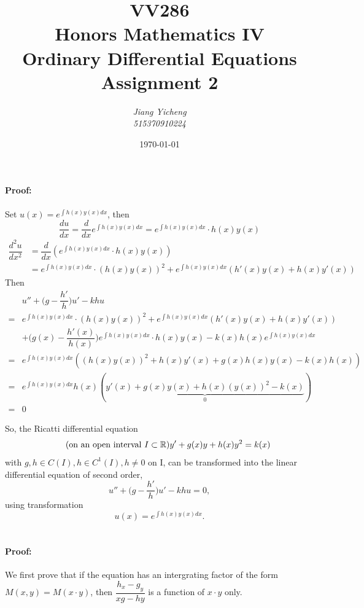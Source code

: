 \documentclass[a4paper,12pt,titlepage]{article}
\author{\textit{Jiang Yicheng}\\\textit{515370910224}}
\title{\textbf{VV286\\ Honors Mathematics IV\\
Ordinary Differential Equations\\
		Assignment 2}}
\date{\today}
\begin{document}
\maketitle

\section{}
\paragraph{Proof:}
Set $u(x)=e^{\int h(x)y(x)dx}$, then
\begin{equation*}
\dfrac{du}{dx}=\dfrac{d}{dx}e^{\int h(x)y(x)dx}=e^{\int h(x)y(x)dx}\cdot h(x)y(x)
\end{equation*}
\begin{align*}
\dfrac{d^2u}{dx^2}&=\dfrac{d}{dx}(e^{\int h(x)y(x)dx}\cdot h(x)y(x))\\
&=e^{\int h(x)y(x)dx}\cdot (h(x)y(x))^2+e^{\int h(x)y(x)dx}(h'(x)y(x)+h(x)y'(x))
\end{align*}
Then
\begin{align*}
&u''+\Big(g-\dfrac{h'}{h}\Big)u'-khu\\
=&e^{\int h(x)y(x)dx}\cdot (h(x)y(x))^2+e^{\int h(x)y(x)dx}(h'(x)y(x)+h(x)y'(x))\\
&+\Big(g(x)-\dfrac{h'(x)}{h(x)}\Big)e^{\int h(x)y(x)dx}\cdot h(x)y(x)-k(x)h(x)e^{\int h(x)y(x)dx}\\
=&e^{\int h(x)y(x)dx}((h(x)y(x))^2+h(x)y'(x)+g(x)h(x)y(x)-k(x)h(x))\\
=&e^{\int h(x)y(x)dx}h(x)(\underbrace{y'(x)+g(x)y(x)+h(x)(y(x))^2-k(x)}_0)\\
=&0
\end{align*}

So, the Ricatti differential equation
\begin{equation}\tag{on an open interval $I\subset \mathbb{R}$}
y'+g(x)y+h(x)y^2=k(x)
\end{equation}
with $g,h\in C(I),h\in C^1(I),h\neq0 $ on I, can be transformed into the linear differential equation of second order,
$$u''+\Big(g-\dfrac{h'}{h}\Big)u'-khu=0,$$
using transformation
$$u(x)=e^{\int h(x)y(x)dx}.$$


\section{}
\paragraph{Proof:} We first prove that if the equation has an intergrating factor of the form $M(x,y)=M(x\cdot y)$, then $\dfrac{h_x-g_y}{xg-hy}$ is a function of $x\cdot y$ only.
\end{document}
